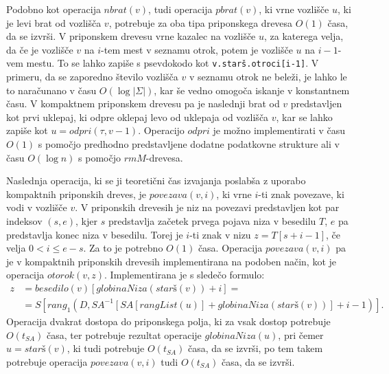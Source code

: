 Podobno kot operacija $nbrat(v)$, tudi operacija $pbrat(v)$, ki vrne vozlišče $u$, ki je levi brat od vozlišča $v$, potrebuje za oba tipa priponskega drevesa $O(1)$ časa, da se izvrši. V priponskem drevesu vrne kazalec na vozlišče $u$, za katerega velja, da če je vozlišče $v$ na $i$-tem mest v seznamu otrok, potem je vozlišče $u$ na $i-1$-vem mestu. To se lahko zapiše s psevdokodo kot \verb|v.starš.otroci[i-1]|. V primeru, da se zaporedno število vozlišča $v$ v seznamu otrok ne beleži, je lahko le to naračunano v času $O(\log|\Sigma|)$, kar še vedno omogoča iskanje v konstantnem času. V kompaktnem priponskem drevesu pa je naslednji brat od $v$ predstavljen kot prvi uklepaj, ki odpre oklepaj levo od uklepaja od vozlišča $v$, kar se lahko zapiše kot $u=odpri(\tau, v-1)$. Operacijo $odpri$ je možno implementirati v času $O(1)$ s pomočjo predhodno predstavljene dodatne podatkovne strukture ali v času $O(\log{n})$ s pomočjo $rmM$-drevesa.

Naslednja operacija, ki se ji teoretični čas izvajanja poslabša z uporabo kompaktnih priponskih dreves, je $povezava(v,i)$, ki vrne $i$-ti znak povezave, ki vodi v vozlišče $v$. V priponskih drevesih je niz na povezavi predstavljen kot par indeksov $(s,e)$, kjer $s$ predstavlja začetek prvega pojava niza v besedilu $T$, $e$ pa predstavlja konec niza v besedilu. Torej je $i$-ti znak v nizu $z=T[s+i-1]$, če velja $0<i\le e-s$. Za to je potrebno $O(1)$ časa. Operacija $povezava(v,i)$ pa je v kompaktnih priponskih drevesih implementirana na podoben način, kot je operacija $otorok(v,z)$. Implementirana je s sledečo formulo:
\begin{equation*}
\begin{split}
        z&=besedilo(v)[globinaNiza(star\textit{š}(v))+i]= \\
        &=S[rang_1(D,SA^{-1}[SA[rangList(u)]+globinaNiza(star\textit{š}(v))]+i-1)].
\end{split}   
\end{equation*}
Operacija dvakrat dostopa do priponskega polja, ki za vsak dostop potrebuje $O(t_{SA})$ časa, ter potrebuje rezultat operacije $globinaNiza(u)$, pri čemer $u=star\textit{š}(v)$, ki tudi potrebuje $O(t_{SA})$ časa, da se izvrši, po tem takem potrebuje operacija $povezava(v,i)$ tudi $O(t_{SA})$ časa, da se izvrši.

